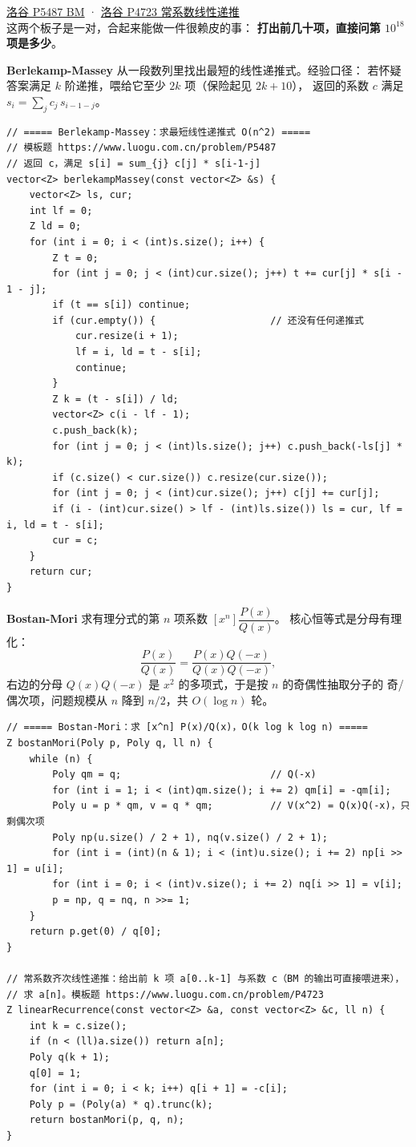 		\href{https://www.luogu.com.cn/problem/P5487}{洛谷 P5487 BM} ·
		\href{https://www.luogu.com.cn/problem/P4723}{洛谷 P4723 常系数线性递推} \\

		这两个板子是一对，合起来能做一件很赖皮的事：
		\textbf{打出前几十项，直接问第 $10^{18}$ 项是多少}。

		\textbf{Berlekamp-Massey} 从一段数列里找出最短的线性递推式。经验口径：
		若怀疑答案满足 $k$ 阶递推，喂给它至少 $2k$ 项（保险起见 $2k + 10$），
		返回的系数 $c$ 满足 $s_i = \sum_j c_j\, s_{i-1-j}$。

		\begin{verbatim}
// ===== Berlekamp-Massey：求最短线性递推式 O(n^2) =====
// 模板题 https://www.luogu.com.cn/problem/P5487
// 返回 c，满足 s[i] = sum_{j} c[j] * s[i-1-j]
vector<Z> berlekampMassey(const vector<Z> &s) {
    vector<Z> ls, cur;
    int lf = 0;
    Z ld = 0;
    for (int i = 0; i < (int)s.size(); i++) {
        Z t = 0;
        for (int j = 0; j < (int)cur.size(); j++) t += cur[j] * s[i - 1 - j];
        if (t == s[i]) continue;
        if (cur.empty()) {                    // 还没有任何递推式
            cur.resize(i + 1);
            lf = i, ld = t - s[i];
            continue;
        }
        Z k = (t - s[i]) / ld;
        vector<Z> c(i - lf - 1);
        c.push_back(k);
        for (int j = 0; j < (int)ls.size(); j++) c.push_back(-ls[j] * k);
        if (c.size() < cur.size()) c.resize(cur.size());
        for (int j = 0; j < (int)cur.size(); j++) c[j] += cur[j];
        if (i - (int)cur.size() > lf - (int)ls.size()) ls = cur, lf = i, ld = t - s[i];
        cur = c;
    }
    return cur;
}
		\end{verbatim}

		\textbf{Bostan-Mori} 求有理分式的第 $n$ 项系数 $[x^n]\dfrac{P(x)}{Q(x)}$。
		核心恒等式是分母有理化：
		$$\frac{P(x)}{Q(x)} = \frac{P(x)Q(-x)}{Q(x)Q(-x)},$$
		右边的分母 $Q(x)Q(-x)$ 是 $x^2$ 的多项式，于是按 $n$ 的奇偶性抽取分子的
		奇/偶次项，问题规模从 $n$ 降到 $n/2$，共 $O(\log n)$ 轮。

		\begin{verbatim}
// ===== Bostan-Mori：求 [x^n] P(x)/Q(x)，O(k log k log n) =====
Z bostanMori(Poly p, Poly q, ll n) {
    while (n) {
        Poly qm = q;                          // Q(-x)
        for (int i = 1; i < (int)qm.size(); i += 2) qm[i] = -qm[i];
        Poly u = p * qm, v = q * qm;          // V(x^2) = Q(x)Q(-x)，只剩偶次项
        Poly np(u.size() / 2 + 1), nq(v.size() / 2 + 1);
        for (int i = (int)(n & 1); i < (int)u.size(); i += 2) np[i >> 1] = u[i];
        for (int i = 0; i < (int)v.size(); i += 2) nq[i >> 1] = v[i];
        p = np, q = nq, n >>= 1;
    }
    return p.get(0) / q[0];
}

// 常系数齐次线性递推：给出前 k 项 a[0..k-1] 与系数 c（BM 的输出可直接喂进来），
// 求 a[n]。模板题 https://www.luogu.com.cn/problem/P4723
Z linearRecurrence(const vector<Z> &a, const vector<Z> &c, ll n) {
    int k = c.size();
    if (n < (ll)a.size()) return a[n];
    Poly q(k + 1);
    q[0] = 1;
    for (int i = 0; i < k; i++) q[i + 1] = -c[i];
    Poly p = (Poly(a) * q).trunc(k);
    return bostanMori(p, q, n);
}
		\end{verbatim}

